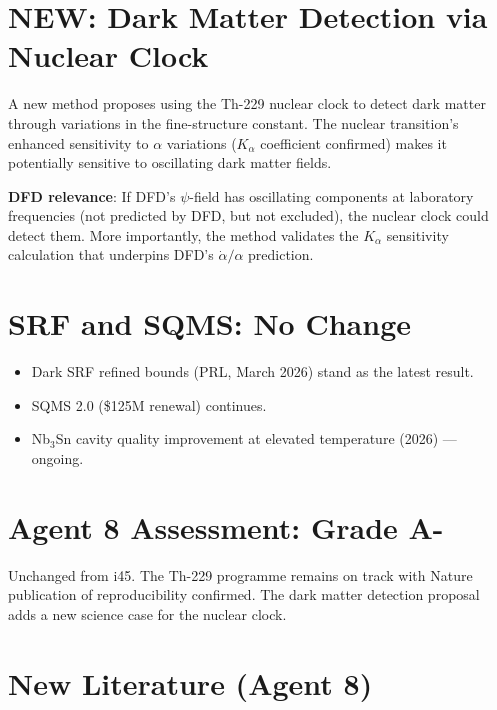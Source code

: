 \documentclass[11pt,a4paper]{article}
\newcommand{\NEW}{\textcolor{dfdblue}{\textbf{NEW}}}
\begin{document}
\section{\NEW: Dark Matter Detection via Nuclear Clock}

\begin{tcolorbox}[colback=blue!5!white, colframe=blue!60!black,
  title={Dark Side of Time: Th-229 Nuclear Clock for Dark Matter Detection (July 2025)}]

A new method proposes using the Th-229 nuclear clock to detect dark matter through variations in the fine-structure constant. The nuclear transition's enhanced sensitivity to $\alpha$ variations ($K_\alpha$ coefficient confirmed) makes it potentially sensitive to oscillating dark matter fields.

\textbf{DFD relevance}: If DFD's $\psi$-field has oscillating components at laboratory frequencies (not predicted by DFD, but not excluded), the nuclear clock could detect them. More importantly, the method validates the $K_\alpha$ sensitivity calculation that underpins DFD's $\dot{\alpha}/\alpha$ prediction.
\end{tcolorbox}

\section{SRF and SQMS: No Change}

\begin{itemize}
\item Dark SRF refined bounds (PRL, March 2026) stand as the latest result.
\item SQMS 2.0 (\$125M renewal) continues.
\item Nb$_3$Sn cavity quality improvement at elevated temperature (2026) --- ongoing.
\end{itemize}

\section{Agent 8 Assessment: Grade A-}

Unchanged from i45. The Th-229 programme remains on track with Nature publication of reproducibility confirmed. The dark matter detection proposal adds a new science case for the nuclear clock.

\section{New Literature (Agent 8)}
\end{document}
